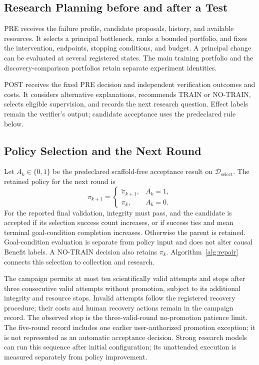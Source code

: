 \subsection{Research Planning before and after a Test}
\label{sec:planning}
PRE receives the failure profile, candidate proposals, history, and available
resources. It selects a principal bottleneck, ranks a bounded portfolio,
and fixes the intervention, endpoints, stopping conditions, and budget.
A principal change can be evaluated at several registered states. The
main training portfolio and the discovery-comparison portfolios retain
separate experiment identities.

POST receives the fixed PRE decision and independent verification outcomes
and costs. It considers alternative explanations, recommends TRAIN or
NO-TRAIN, selects eligible supervision, and records the next research
question. Effect labels remain the verifier's output; candidate acceptance
uses the predeclared rule below.

\subsection{Policy Selection and the Next Round}
\label{app:round-procedure}
Let $A_k\in\{0,1\}$ be the predeclared scaffold-free acceptance result on
$\mathcal D_{\mathrm{select}}$. The retained policy for the next round is
\begin{equation}
\pi_{k+1}=\begin{cases}
\widetilde\pi_{k+1},&A_k=1,\\
\pi_k,&A_k=0.
\end{cases}
\label{eq:promotion}
\end{equation}
For the reported final validation, integrity must pass, and the candidate
is accepted if its selection success count increases, or if success ties
and mean terminal goal-condition completion increases. Otherwise the
parent is retained. Goal-condition evaluation is separate from policy
input and does not alter causal Benefit labels. A NO-TRAIN decision also retains $\pi_k$.
Algorithm~\ref{alg:repair} connects this selection to collection and research.


The campaign permits at most ten scientifically valid attempts and stops
after three consecutive valid attempts without promotion, subject to its
additional integrity and resource stops. Invalid attempts follow the
registered recovery procedure; their costs and human recovery actions
remain in the campaign record. The observed stop is the three-valid-round no-promotion patience limit.
The five-round record includes one earlier user-authorized promotion
exception; it is not represented as an automatic acceptance decision.
Strong research models can run this sequence after initial configuration;
its unattended execution is measured separately from policy improvement.

